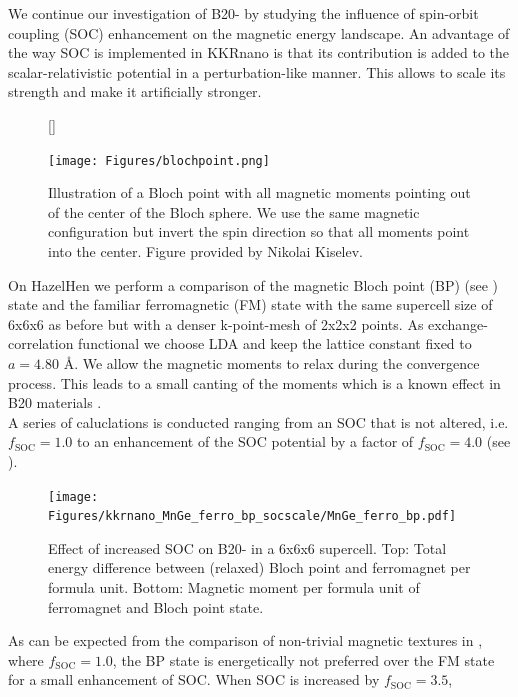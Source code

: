 \documentclass [a4paper, 12pt]{article}
\begin{document}
We continue our investigation of B20- by studying the influence of spin-orbit
coupling (SOC) enhancement on the magnetic energy landscape.
An advantage of the way SOC is implemented in KKRnano is that
its contribution is added to the scalar-relativistic
potential in a perturbation-like manner. This allows to scale its strength and make it
artificially stronger. \\
\begin{figure}
	[\FBwidth]
{\caption{Illustration of a Bloch point with all magnetic moments pointing out of the center of the Bloch sphere.
	We use the same magnetic configuration but invert the spin direction so that all moments point
	into the center. Figure provided by Nikolai Kiselev.}\label{fig:blochpoint}}
{\texttt{[image: Figures/blochpoint.png]}}
\end{figure}
On HazelHen we perform a comparison of the magnetic Bloch point (BP) (see ) 
state and the familiar ferromagnetic (FM) state
with the same supercell size of 6x6x6 as before but with a denser k-point-mesh of 2x2x2 points.
As exchange-correlation functional we choose LDA and keep the lattice constant fixed to $a=4.80$ \AA.
We allow the magnetic moments to relax during the convergence process.
This leads to a small canting of the moments which is a known effect in
B20 materials \cite{chizhikov_multishell_2013}.
\\
A series of caluclations is conducted ranging from an SOC that is not altered, i.e. $f_{\text{SOC}}=1.0$ to
an enhancement of the SOC potential by a
factor of $f_{\text{SOC}}=4.0$ (see ).
\begin{figure}[h]
\begin{center}
 \texttt{[image: Figures/kkrnano\_MnGe\_ferro\_bp\_socscale/MnGe\_ferro\_bp.pdf]}
\end{center}
\caption{Effect of increased SOC on B20- in a 6x6x6 supercell.
	Top: Total energy difference between (relaxed) Bloch point and ferromagnet per formula unit.
	Bottom: Magnetic moment per formula unit of ferromagnet and Bloch point state.
	}
\label{fig:MnGe_ferro_bp_socscale}
\end{figure}
As can be expected from the comparison of non-trivial magnetic textures 
in , where $f_{\text{SOC}}=1.0$, 
the BP state is energetically not preferred over the FM state for a small
enhancement of SOC.
When SOC is increased by $f_{\text{SOC}}=3.5$,
\end{document}
